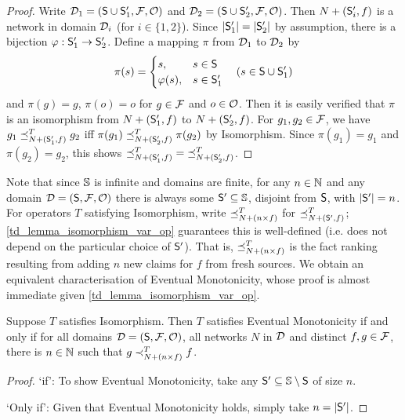 \begin{proof}
    Write $\D_1 = (\S \cup \S'_1, \F, \O)$ and $\D_2 = (\S \cup \S'_2, \F,
    \O)$. Then $N + (\S'_i, f)$ is a network in domain $\D_i$ (for $i \in \{1,
    2\}$). Since $|\S'_1| = |\S'_2|$ by assumption, there is a bijection $\phi:
    \S'_1 \to \S'_2$. Define a mapping $\pi$ from $\D_1$ to $\D_2$ by
    \[
        \pi(s) = \begin{cases}
            s,& s \in \S \\
            \phi(s),& s \in \S'_1
        \end{cases}
        \quad (s \in \S \cup \S'_1)
    \]
    and $\pi(g) = g$, $\pi(o) = o$ for $g \in \F$ and $o \in \O$. Then it is
    easily verified that $\pi$ is an isomorphism from $N + (\S'_1, f)$ to $N +
    (\S'_2, f)$. For $g_1, g_2 \in \F$, we have $g_1 \fle_{N + (\S'_1, f)}^T
    g_2$ iff $\pi(g_1) \fle_{N + (\S'_2, f)}^T \pi(g_2)$ by Isomorphism. Since
    $\pi(g_1) = g_1$ and $\pi(g_2) = g_2$, this shows ${\fle_{N + (\S'_1,
    f)}^T} = {{\fle_{N + (\S'_2, f)}^T}}$.
\end{proof}

Note that since $\uS$ is infinite and domains are finite, for any $n \in \Nat$
and any domain $\D = (\S, \F, \O)$ there is always some $\S' \subseteq \uS$,
disjoint from $\S$, with $|\S'| = n$. For operators $T$ satisfying Isomorphism,
write $\fle_{N + (n \times f)}^T$ for $\fle_{N + (\S', f)}^T$;
\cref{td_lemma_isomorphism_var_op} guarantees this is well-defined (i.e. does not
depend on the particular choice of $\S'$). That is, $\fle_{N + (n \times f)}^T$
is the fact ranking resulting from adding $n$ new claims for $f$ from fresh
sources. We obtain an equivalent characterisation of Eventual Monotonicity,
whose proof is almost immediate given \cref{td_lemma_isomorphism_var_op}.

\begin{proposition}
    \label{td_prop_eventual_mon_iff_improvement}
    Suppose $T$ satisfies Isomorphism. Then $T$ satisfies Eventual Monotonicity
    if and only if for all domains $\D = (\S, \F, \O)$, all networks $N$ in
    $\D$ and distinct $f, g \in \F$, there is $n \in \Nat$ such that $g \flt_{N
    + (n \times f)}^T f$.
\end{proposition}

\begin{proof}
    `if': To show Eventual Monotonicity, take any $\S' \subseteq \uS \setminus
    \S$ of size $n$.

    `Only if': Given that Eventual Monotonicity holds, simply take $n = |\S'|$.
\end{proof}


